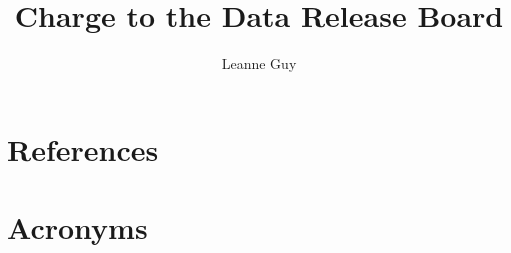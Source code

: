 \documentclass[OPS,authoryear,toc]{lsstdoc}
\title{Charge to the Data Release Board}
\author{%
Leanne Guy
}
\date{\vcsDate}
\begin{document}
\maketitle


\appendix
\section{References} \label{sec:bib}
\renewcommand{\refname}{} %


\section{Acronyms} \label{sec:acronyms}

\end{document}
